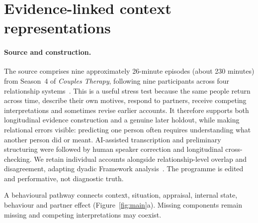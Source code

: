 \documentclass{article}
\begin{document}
\section{Evidence-linked context representations}

\paragraph{Source and construction.}
The source comprises nine approximately 26-minute episodes (about 230 minutes) from Season~4
of \textit{Couples Therapy}, following nine participants across four relationship systems~\cite{kriegman2024couples}.
This is a useful stress test because the same people return across time, describe their own motives,
respond to partners, receive competing interpretations and sometimes revise earlier accounts. It
therefore supports both longitudinal evidence construction and a genuine later holdout, while making
relational errors visible: predicting one person often requires understanding what another person
did or meant. AI-assisted transcription and preliminary structuring were followed by human speaker
correction and longitudinal cross-checking. We retain individual accounts alongside relationship-level
overlap and disagreement, adapting dyadic Framework analysis~\cite{collaco2021framework}. The programme is
edited and performative, not diagnostic truth.

A behavioural pathway connects context, situation, appraisal, internal state, behaviour and partner
effect (Figure~\ref{fig:main}a). Missing components remain missing and competing interpretations
may coexist.
\end{document}
